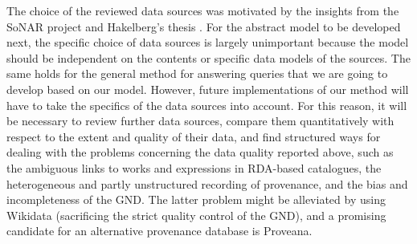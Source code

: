 The choice of the reviewed data sources was motivated by the insights from
the \gls{SoNAR} project and Hakelberg's thesis \autocite{Hakelberg2016}.
For the abstract model to be developed next,
the specific choice of data sources is largely unimportant
because the model should be independent on the contents or specific data models of the sources.
The same holds for the general method for answering queries that we are going to develop based on our model.
However, future implementations of our method will have to take the specifics
of the data sources into account.
For this reason, it will be necessary to review further data sources,
compare them quantitatively with respect to the extent and quality of their data,
and find structured ways for dealing with the problems concerning the data quality
reported above, such as the ambiguous links to works and expressions in RDA-based
catalogues, the heterogeneous and partly unstructured recording of provenance,
and the bias and incompleteness of the \gls{GND}.
The latter problem might be alleviated by using Wikidata
(sacrificing the strict quality control of the GND),
and a promising candidate for an alternative provenance database is Proveana.
